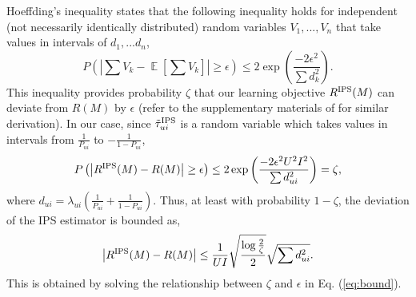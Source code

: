 \documentclass[manuscript,screen]{acmart}
\DeclareMathOperator{\E}{\mathbb{E}}
\begin{document}
Hoeffding's inequality \cite{Hoeffding94} states that the following inequality holds for independent (not necessarily identically distributed) random variables $V_1, ..., V_n$ that take values in intervals of $d_1, ... d_n$,
\begin{equation}
P\left(\left| \sum V_k - \E \left[\sum V_k\right] \right| \geq \epsilon \right) \leq 2 \exp\left(\frac{-2\epsilon^2}{\sum d_k^2} \right).
\end{equation}
This inequality provides probability $\zeta$ that our learning objective $R^{\textnormal{IPS}}(M)$ can deviate from $R(M)$ by $\epsilon$ (refer to the supplementary materials of \cite{Schnabel16, Wang19} for similar derivation).
In our case, since $\tilde{\tau}_{ui}^{\textnormal{IPS}}$ is a random variable which takes values in intervals from $\frac{1}{P_{ui}}$ to $-\frac{1}{1-P_{ui}}$,
\begin{equation}
\label{eq:bound}
P\left( \left| R^{\textnormal{IPS}}(M) - R(M) \right| \geq \epsilon \right) \leq 2 \exp\left(\frac{-2\epsilon^2 U^2 I^2}{\sum d_{ui}^2} \right) = \zeta,
\end{equation}
where $d_{ui} = \lambda_{ui} \left(\frac{1}{P_{ui}} + \frac{1}{1-P_{ui}}\right)$.
Thus, at least with probability $1-\zeta$, the deviation of the IPS estimator is bounded as,
\begin{equation}
\label{eq:tail_bound_IPS}
\left| R^{\textnormal{IPS}}(M) - R(M) \right| \leq \frac{1}{UI} \sqrt{\frac{\log \frac{2}{\zeta}}{2}} \sqrt {\sum d_{ui}^2}.
\end{equation}
This is obtained by solving the relationship between $\zeta$ and $\epsilon$ in Eq. (\ref{eq:bound}).
\end{document}
